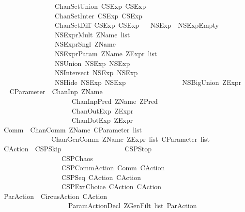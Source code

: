 \begin{isabellebody}
\ \ \ \ \ \ \ \ \ \ \ \ \ \ \ {\isacharbar}\ ChanSetUnion\ CSExp\ CSExp\isanewline
\ \ \ \ \ \ \ \ \ \ \ \ \ \ \ {\isacharbar}\ ChanSetInter\ CSExp\ CSExp\isanewline
\ \ \ \ \ \ \ \ \ \ \ \ \ \ \ {\isacharbar}\ ChanSetDiff\ CSExp\ CSExp\isanewline
\ \isanewline
{}\isamarkupfalse%
\ NSExp\ {\isacharequal}\ NSExpEmpty\isanewline
\ \ \ \ \ \ \ \ \ \ \ \ \ \ \ {\isacharbar}\ NSExprMult\ {\isachardoublequoteopen}ZName\ list{\isachardoublequoteclose}\isanewline
\ \ \ \ \ \ \ \ \ \ \ \ \ \ \ {\isacharbar}\ NSExprSngl\ ZName\isanewline
\ \ \ \ \ \ \ \ \ \ \ \ \ \ \ {\isacharbar}\ NSExprParam\ ZName\ {\isachardoublequoteopen}ZExpr\ list{\isachardoublequoteclose}\isanewline
\ \ \ \ \ \ \ \ \ \ \ \ \ \ \ {\isacharbar}\ NSUnion\ NSExp\ NSExp\isanewline
\ \ \ \ \ \ \ \ \ \ \ \ \ \ \ {\isacharbar}\ NSIntersect\ NSExp\ NSExp\isanewline
\ \ \ \ \ \ \ \ \ \ \ \ \ \ \ {\isacharbar}\ NSHide\ NSExp\ NSExp\isanewline
\ \ \ \ \ \ \ \ \ \ \ \ \ \ \ {\isacharbar}\ NSBigUnion\ ZExpr\isanewline
\ \isanewline
{}\isamarkupfalse%
\ CParameter\ {\isacharequal}\ ChanInp\ ZName\isanewline
\ \ \ \ \ \ \ \ \ \ \ \ \ \ \ \ \ \ \ \ {\isacharbar}\ ChanInpPred\ ZName\ ZPred\isanewline
\ \ \ \ \ \ \ \ \ \ \ \ \ \ \ \ \ \ \ \ {\isacharbar}\ ChanOutExp\ ZExpr\isanewline
\ \ \ \ \ \ \ \ \ \ \ \ \ \ \ \ \ \ \ \ {\isacharbar}\ ChanDotExp\ ZExpr\isanewline
\ \isanewline
{}\isamarkupfalse%
\ Comm\ {\isacharequal}\ ChanComm\ ZName\ {\isachardoublequoteopen}CParameter\ list{\isachardoublequoteclose}\isanewline
\ \ \ \ \ \ \ \ \ \ \ \ \ \ {\isacharbar}\ ChanGenComm\ ZName\ {\isachardoublequoteopen}ZExpr\ list{\isachardoublequoteclose}\ {\isachardoublequoteopen}CParameter\ list{\isachardoublequoteclose}%
\isamarkuptrue%
\isamarkupfalse%
\ CAction\ {\isacharequal}\ CSPSkip\isanewline
\ \ \ \ \ \ \ \ \ \ \ \ \ \ \ \ \ {\isacharbar}\ CSPStop\isanewline
\ \ \ \ \ \ \ \ \ \ \ \ \ \ \ \ \ {\isacharbar}\ CSPChaos\isanewline
\ \ \ \ \ \ \ \ \ \ \ \ \ \ \ \ \ {\isacharbar}\ CSPCommAction\ Comm\ CAction\isanewline
\ \ \ \ \ \ \ \ \ \ \ \ \ \ \ \ \ {\isacharbar}\ CSPSeq\ CAction\ CAction\isanewline
\ \ \ \ \ \ \ \ \ \ \ \ \ \ \ \ \ {\isacharbar}\ CSPExtChoice\ CAction\ CAction\isanewline
\ \isanewline
{}\isamarkupfalse%
\ ParAction\ {\isacharequal}\ CircusAction\ CAction\isanewline
\ \ \ \ \ \ \ \ \ \ \ \ \ \ \ \ \ \ \ {\isacharbar}\ ParamActionDecl\ {\isachardoublequoteopen}ZGenFilt\ list{\isachardoublequoteclose}\ ParAction%
\isamarkuptrue%

\end{isabellebody}

